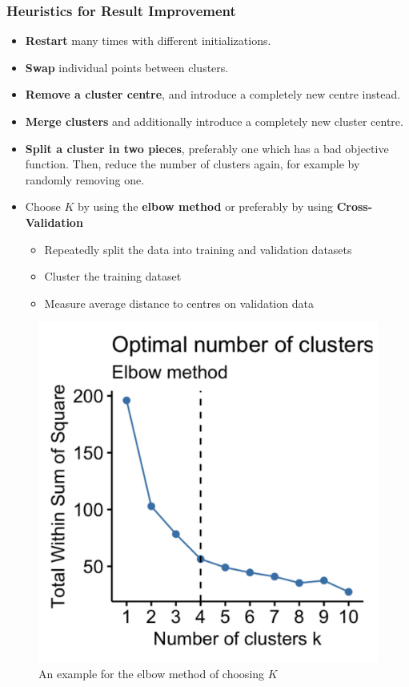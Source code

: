 \documentclass[11pt]{article}
\theoremstyle{definition}
\begin{document}
\subsubsection{Heuristics for Result Improvement}
\begin{itemize}
	\item \textbf{Restart} many times with different initializations.
	\item \textbf{Swap} individual points between clusters.
	\item \textbf{Remove a cluster centre}, and introduce a completely new centre instead.
	\item \textbf{Merge clusters} and additionally introduce a completely new cluster centre.
	\item \textbf{Split a cluster in two pieces}, preferably one which has a bad objective function. Then, reduce the number of clusters again, for example by randomly removing one.
	\item Choose $K$ by using the \textbf{elbow method} or preferably by using \textbf{Cross-Validation}
	\begin{itemize}
		\item Repeatedly split the data into training and validation datasets
		\item Cluster the training dataset
		\item Measure average distance to centres on validation data
	\end{itemize}
\end{itemize}

\begin{figure}[tbh]
	\centering
	\includegraphics[width=0.4\linewidth]{img/elbow_method_illustration}
	\caption{An example for the elbow method of choosing $K$}
	\label{fig:elbowmethodillustration}
\end{figure}
\end{document}
